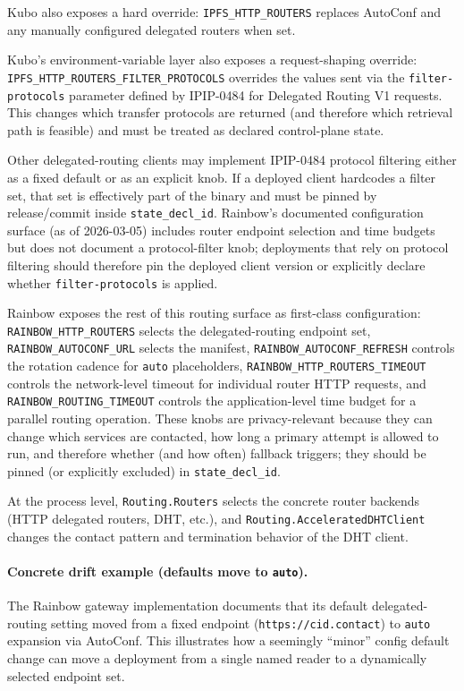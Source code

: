 \documentclass[11pt]{article}
\begin{document}
Kubo also exposes a hard override: \texttt{IPFS\_HTTP\_ROUTERS} replaces AutoConf and any manually configured delegated routers when set.\cite{kuboEnvVars}

Kubo's environment-variable layer also exposes a request-shaping override: \texttt{IPFS\_HTTP\_ROUTERS\_\allowbreak FILTER\_\allowbreak PROTOCOLS} overrides the values sent via the \texttt{filter-protocols} parameter defined by IPIP-0484 for Delegated Routing V1 requests. This changes which transfer protocols are returned (and therefore which retrieval path is feasible) and must be treated as declared control-plane state.
\cite{kuboEnvVars,ipip0484,ipfsDelegatedRoutingV1Spec}

Other delegated-routing clients may implement IPIP-0484 protocol filtering either as a fixed default or as an explicit knob.
If a deployed client hardcodes a filter set, that set is effectively part of the binary and must be pinned by release/commit inside \texttt{state\_decl\_id}.
Rainbow's documented configuration surface (as of 2026-03-05) includes router endpoint selection and time budgets but does not document a protocol-filter knob; deployments that rely on protocol filtering should therefore pin the deployed client version or explicitly declare whether \texttt{filter-protocols} is applied.
\cite{rainbowEnvVars,ipip0484}

Rainbow exposes the rest of this routing surface as first-class configuration: \texttt{RAINBOW\_HTTP\_ROUTERS} selects the delegated-routing endpoint set, \texttt{RAINBOW\_AUTOCONF\_URL} selects the manifest, \texttt{RAINBOW\_AUTOCONF\_\allowbreak REFRESH} controls the rotation cadence for \texttt{auto} placeholders, \texttt{RAINBOW\_HTTP\_ROUTERS\_\allowbreak TIMEOUT} controls the network-level timeout for individual router HTTP requests, and \texttt{RAINBOW\_ROUTING\_\allowbreak TIMEOUT} controls the application-level time budget for a parallel routing operation. These knobs are privacy-relevant because they can change which services are contacted, how long a primary attempt is allowed to run, and therefore whether (and how often) fallback triggers; they should be pinned (or explicitly excluded) in \texttt{state\_decl\_id}.\cite{rainbowEnvVars}

At the process level, \texttt{Routing.Routers} selects the concrete router backends (HTTP delegated routers, DHT, etc.), and \texttt{Routing.AcceleratedDHTClient} changes the contact pattern and termination behavior of the DHT client.\cite{kuboConfigPathRouting}

\paragraph{Concrete drift example (defaults move to \texttt{auto}).}
The Rainbow gateway implementation documents that its default delegated-routing setting moved from a fixed endpoint (\texttt{https://cid.contact}) to \texttt{auto} expansion via AutoConf.
This illustrates how a seemingly ``minor'' config default change can move a deployment from a single named reader to a dynamically selected endpoint set.\cite{rainbowChangelogAutoconf}
\end{document}
